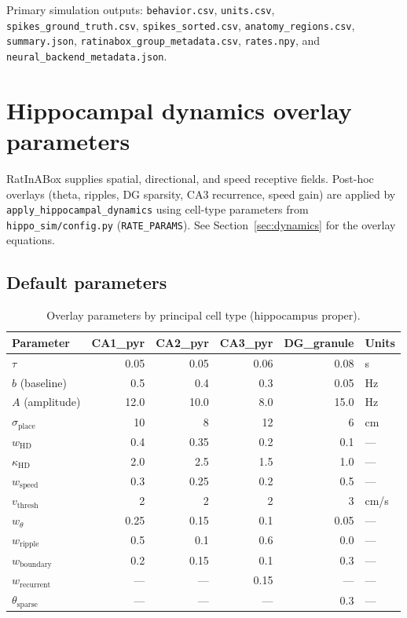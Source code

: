 \documentclass[11pt,a4paper]{article}
\begin{document}
Primary simulation outputs: \texttt{behavior.csv}, \texttt{units.csv}, \texttt{spikes\_ground\_truth.csv}, \texttt{spikes\_sorted.csv}, \texttt{anatomy\_regions.csv}, \texttt{summary.json}, \texttt{ratinabox\_group\_metadata.csv}, \texttt{rates.npy}, and \texttt{neural\_backend\_metadata.json}.

\section{Hippocampal dynamics overlay parameters}
\label{sec:rates}

RatInABox supplies spatial, directional, and speed receptive fields.
Post-hoc overlays (theta, ripples, DG sparsity, CA3 recurrence, speed gain) are applied by \texttt{apply\_hippocampal\_dynamics} using cell-type parameters from \texttt{hippo\_sim/config.py} (\texttt{RATE\_PARAMS}).
See Section~\ref{sec:dynamics} for the overlay equations.

\subsection{Default parameters}
\begin{table}[h]
\centering
\caption{Overlay parameters by principal cell type (hippocampus proper).}
\label{tab:rate-params}
\small
\begin{tabular}{@{}lrrrrl@{}}
\toprule
Parameter & CA1\_pyr & CA2\_pyr & CA3\_pyr & DG\_granule & Units \\
\midrule
$\tau$ & 0.05 & 0.05 & 0.06 & 0.08 & s \\
$b$ (baseline) & 0.5 & 0.4 & 0.3 & 0.05 & Hz \\
$A$ (amplitude) & 12.0 & 10.0 & 8.0 & 15.0 & Hz \\
$\sigma_{\mathrm{place}}$ & 10 & 8 & 12 & 6 & cm \\
$w_{\mathrm{HD}}$ & 0.4 & 0.35 & 0.2 & 0.1 & --- \\
$\kappa_{\mathrm{HD}}$ & 2.0 & 2.5 & 1.5 & 1.0 & --- \\
$w_{\mathrm{speed}}$ & 0.3 & 0.25 & 0.2 & 0.5 & --- \\
$v_{\mathrm{thresh}}$ & 2 & 2 & 2 & 3 & cm/s \\
$w_\theta$ & 0.25 & 0.15 & 0.1 & 0.05 & --- \\
$w_{\mathrm{ripple}}$ & 0.5 & 0.1 & 0.6 & 0.0 & --- \\
$w_{\mathrm{boundary}}$ & 0.2 & 0.15 & 0.1 & 0.3 & --- \\
$w_{\mathrm{recurrent}}$ & --- & --- & 0.15 & --- & --- \\
$\theta_{\mathrm{sparse}}$ & --- & --- & --- & 0.3 & --- \\
\bottomrule
\end{tabular}
\end{table}
\end{document}
